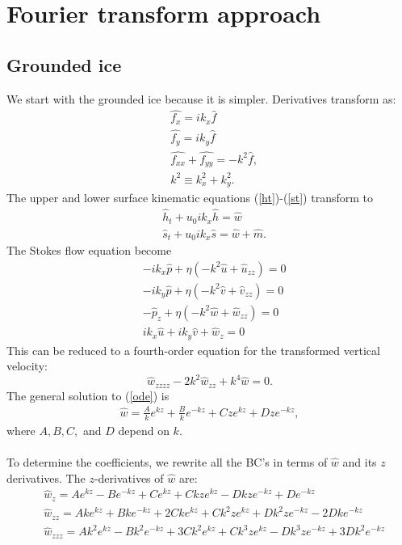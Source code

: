 \documentclass[paper=a4, fontsize=11pt]{article}
\begin{document}
\section*{Fourier transform approach}
\subsection*{Grounded ice}
We start with the grounded ice because it is simpler.
Derivatives transform as:
\begin{align}
&\widehat{f_x} = ik_x\widehat{f} \\
&\widehat{f_y} = ik_y\widehat{f} \\
&\widehat{f_{xx}} + \widehat{f_{yy}} = -k^2 \widehat{f}, \\ &k^2 \equiv k_x^2 + k_y^2.
\end{align}
The upper and lower surface kinematic equations (\ref{ht})-(\ref{st}) transform to
\begin{align}
&\widehat{h}_t + u_0 ik_x \widehat{h} = \widehat{w}\label{hthat}\\
&\widehat{s}_t + u_0 ik_x \widehat{s} = \widehat{w}+\widehat{m}.\label{sthat}
\end{align}
The Stokes flow equation become
\begin{align}
&-ik_x\widehat{p} + \eta ( -k^2\widehat{u} + \widehat{u}_{zz}) = 0 \\
&-ik_y\widehat{p} + \eta ( -k^2\widehat{v} + \widehat{v}_{zz}) = 0 \\
&-\widehat{p}_z + \eta (-k^2\widehat{w} + \widehat{w}_{zz}) = 0 \\
&ik_x\widehat{u} + ik_y\widehat{v} + \widehat{w}_z = 0
\end{align}
This can be reduced to a fourth-order equation for the transformed vertical velocity:
\begin{equation}
\widehat{w}_{zzzz} - 2k^2 \widehat{w}_{zz} + k^4 \widehat{w}=0. \label{ode}
\end{equation}
The general solution to (\ref{ode}) is
\begin{align}
\widehat{w} = \frac{A}{k}e^{k z} + \frac{B}{k}e^{-k z} + {C}ze^{k z}+ {D}ze^{-k z},
\end{align}
where $A,B,C,$ and $D$ depend on $k$.\\ \\
To determine the coefficients, we rewrite all the BC's in terms of $\widehat{w}$ and its $z$ derivatives.
The $z$-derivatives of $\widehat{w}$ are:
\begin{align}
&\widehat{w}_{z} = {A}e^{k z} - {B}e^{-k z} + {C}e^{k z} + {C}kze^{k z} - {D}kze^{-k z} + {D}e^{-k z} \\
&\widehat{w}_{zz} = {Ak}e^{k z} + {Bk}e^{-k z} + {2Ck}e^{k z} + {C}k^2 ze^{k z} + {D}k^2ze^{-k z} - {2Dk}e^{-k z} \\
&\widehat{w}_{zzz} = {Ak^2}e^{k z} - {Bk^2}e^{-k z} + {3Ck^2}e^{k z} + {C}k^3 ze^{k z} - {D}k^3ze^{-k z} + {3Dk^2}e^{-k z}
\end{align}
\end{document}
